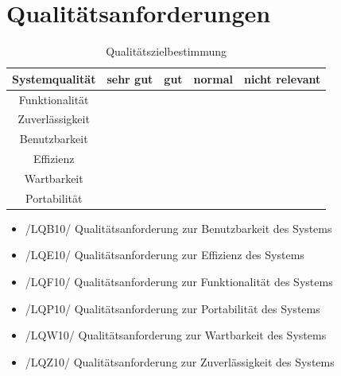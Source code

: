 \documentclass[12pt, a4paper]{article}
\begin{document}
\section{Qualitätsanforderungen}
\newcommand{\xmark}{\ding{55}}%
\begin{table}[h]
	\centering
\begin{tabular}{ || c | c | c | c | c || }
	\hline
	Systemqualität & sehr gut & gut & normal & nicht relevant  \\ \hline
	Funktionalität &  & \xmark &  &  \\ \hline
	Zuverlässigkeit &  & \xmark &  &  \\ \hline
	Benutzbarkeit &  \xmark & &  &  \\ \hline
	Effizienz &  &  & \xmark  &  \\ \hline
	Wartbarkeit &  &  & \xmark &  \\ \hline
	Portabilität &  &  &  & \xmark \\
	\hline
\end{tabular}
\caption{Qualitätszielbestimmung}
\label{table:qualitätsanforderungen}
\end{table}
\begin{itemize}
	\item /LQB10/ Qualitätsanforderung zur Benutzbarkeit des Systems
	\item /LQE10/ Qualitätsanforderung zur Effizienz des Systems
	\item /LQF10/ Qualitätsanforderung zur Funktionalität des Systems
	\item /LQP10/ Qualitätsanforderung zur Portabilität des Systems
	\item /LQW10/ Qualitätsanforderung zur Wartbarkeit des Systems
	\item /LQZ10/ Qualitätsanforderung zur Zuverlässigkeit des Systems
\end{itemize}
\pagebreak
\end{document}
